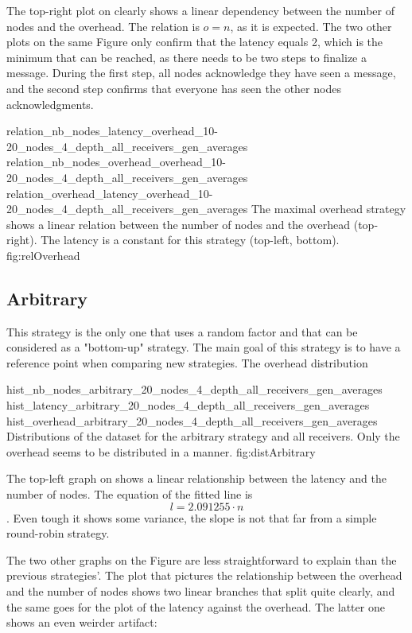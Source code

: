 The top-right plot on  clearly shows a linear
dependency between the number of nodes and the overhead. The relation is \(o =
n\), as it is expected.
The two other plots on the same Figure only confirm that the latency equals 2,
which is the minimum that can be reached, as there needs to be two steps to
finalize a message. During the first step, all nodes acknowledge they have seen
a message, and the second step confirms that everyone has seen the other nodes
acknowledgments.

\triplefigure
    {relation_nb_nodes_latency_overhead_10-20_nodes_4_depth_all_receivers_gen_averages}
    {relation_nb_nodes_overhead_overhead_10-20_nodes_4_depth_all_receivers_gen_averages}
    {relation_overhead_latency_overhead_10-20_nodes_4_depth_all_receivers_gen_averages}
    {The maximal overhead  strategy shows a linear relation between the number of
    nodes and the overhead (top-right). The latency is a constant for this
    strategy (top-left, bottom).}
    {fig:relOverhead}

\FloatBarrier
\subsection{Arbitrary}
\label{ssec:arbitrary}

This strategy is the only one that uses a random factor and that can be
considered as a "bottom-up" strategy. The main goal of this strategy is to
have a reference point when comparing new strategies.
The overhead distribution 

\triplefigure
    {hist_nb_nodes_arbitrary_20_nodes_4_depth_all_receivers_gen_averages}
    {hist_latency_arbitrary_20_nodes_4_depth_all_receivers_gen_averages}
    {hist_overhead_arbitrary_20_nodes_4_depth_all_receivers_gen_averages}
    {Distributions of the dataset for the arbitrary strategy and all
    receivers. Only the overhead seems to be distributed in a  manner. }
    {fig:distArbitrary}

The top-left graph on  shows a linear relationship
between the latency and the number of nodes. The equation of the fitted line is
\[l = 2.091255 \cdot n\]. Even tough it shows some variance, the slope is
not that far from a simple round-robin strategy. 

The two other graphs on the Figure are less straightforward to explain than the
previous strategies'. The plot that pictures the relationship between the
overhead and the number of nodes shows two linear branches that split quite
clearly, and the same goes for the plot of the latency against the overhead.
The latter one shows an even weirder artifact: 

